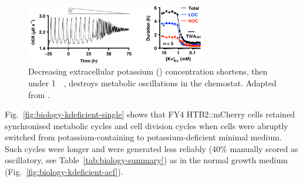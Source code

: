 \begin{figure}[hb!]
  \centering
  \includegraphics[width=0.7\textwidth]{oneillEukaryoticCellBiology2020_4_adapted.png}
  \caption{
    Decreasing extracellular potassium () concentration shortens, then under \SI{1}{\milli\molar}, destroys metabolic oscillations in the chemostat.
    Adapted from \textcite{oneillEukaryoticCellBiology2020}.
  }
  \label{fig:biology-kdeficient-oneill}
\end{figure}

Fig.\ \ref{fig:biology-kdeficient-single} shows that FY4 HTB2::mCherry cells retained synchronised metabolic cycles and cell division cycles when cells were abruptly switched from potassium-containing to potassium-deficient minimal medium.
Such cycles were longer and were generated less reliably (40\% manually scored as oscillatory, see Table~\ref{tab:biology-summary}) as in the normal growth medium (Fig.\ \ref{fig:biology-kdeficient-acf}).

